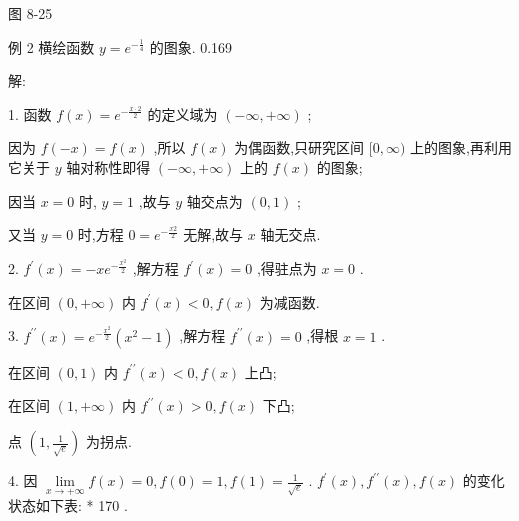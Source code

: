 \documentclass[10pt]{article}
\begin{document}
图 8-25

例 2 横绘函数 \(y = {e}^{-\frac{1}{4}}\) 的图象. 0.169

解:

1. 函数 \(f\left( x\right) = {e}^{-\frac{x \cdot 2}{2}}\) 的定义域为 \(\left( {-\infty , + \infty }\right)\) ;

因为 \(f\left( {-x}\right) = f\left( x\right)\) ,所以 \(f\left( x\right)\) 为偶函数,只研究区间 \(\lbrack 0,\infty )\) 上的图象,再利用它关于 \(y\) 轴对称性即得 \(\left( {-\infty , + \infty }\right)\) 上的 \(f\left( x\right)\) 的图象;

因当 \(x = 0\) 时, \(y = 1\) ,故与 \(y\) 轴交点为 \(\left( {0,1}\right)\) ;

又当 \(y = 0\) 时,方程 \(0 = {e}^{-\frac{x2}{2}}\) 无解,故与 \(x\) 轴无交点.

2. \({f}^{\prime }\left( x\right) = - x{e}^{-\frac{{x}^{2}}{2}}\) ,解方程 \({f}^{\prime }\left( x\right) = 0\) ,得驻点为 \(x = 0\) .

在区间 \(\left( {0, + \infty }\right)\) 内 \({f}^{\prime }\left( x\right) < 0,f\left( x\right)\) 为减函数.

3. \({f}^{\prime \prime }\left( x\right) = {e}^{-\frac{{x}^{2}}{2}}\left( {{x}^{2} - 1}\right)\) ,解方程 \({f}^{\prime \prime }\left( x\right) = 0\) ,得根 \(x = 1\) .

在区间 \(\left( {0,1}\right)\) 内 \({f}^{\prime \prime }\left( x\right) < 0,f\left( x\right)\) 上凸;

在区间 \(\left( {1, + \infty }\right)\) 内 \({f}^{\prime \prime }\left( x\right) > 0,f\left( x\right)\) 下凸;

点 \(\left( {1,\frac{1}{\sqrt{e}}}\right)\) 为拐点.

4. 因 \(\mathop{\lim }\limits_{{x \rightarrow + \infty }}f\left( x\right) = 0,f\left( 0\right) = 1,f\left( 1\right) = \frac{1}{\sqrt{e}}\) . \({f}^{\prime }\left( x\right) ,{f}^{\prime \prime }\left( x\right) ,f\left( x\right)\) 的变化状态如下表: * 170 .

\begin{center}
\end{center}
\end{document}
